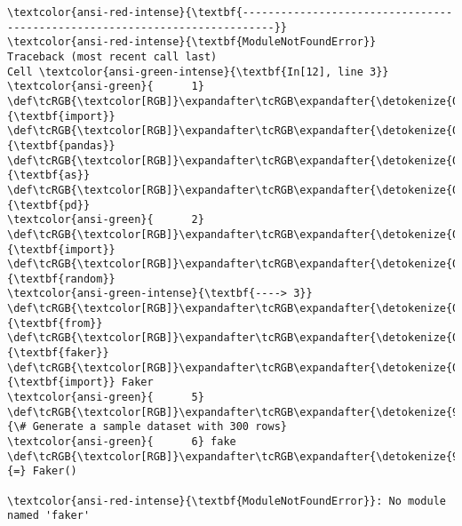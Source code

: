 \documentclass[11pt]{article}
\begin{document}
    \begin{Verbatim}[commandchars=\\\{\}, frame=single, framerule=2mm, rulecolor=\color{outerrorbackground}]
\textcolor{ansi-red-intense}{\textbf{---------------------------------------------------------------------------}}
\textcolor{ansi-red-intense}{\textbf{ModuleNotFoundError}}                       Traceback (most recent call last)
Cell \textcolor{ansi-green-intense}{\textbf{In[12], line 3}}
\textcolor{ansi-green}{      1} \def\tcRGB{\textcolor[RGB]}\expandafter\tcRGB\expandafter{\detokenize{0,135,0}}{\textbf{import}} \def\tcRGB{\textcolor[RGB]}\expandafter\tcRGB\expandafter{\detokenize{0,0,255}}{\textbf{pandas}} \def\tcRGB{\textcolor[RGB]}\expandafter\tcRGB\expandafter{\detokenize{0,135,0}}{\textbf{as}} \def\tcRGB{\textcolor[RGB]}\expandafter\tcRGB\expandafter{\detokenize{0,0,255}}{\textbf{pd}}
\textcolor{ansi-green}{      2} \def\tcRGB{\textcolor[RGB]}\expandafter\tcRGB\expandafter{\detokenize{0,135,0}}{\textbf{import}} \def\tcRGB{\textcolor[RGB]}\expandafter\tcRGB\expandafter{\detokenize{0,0,255}}{\textbf{random}}
\textcolor{ansi-green-intense}{\textbf{----> 3}} \def\tcRGB{\textcolor[RGB]}\expandafter\tcRGB\expandafter{\detokenize{0,135,0}}{\textbf{from}} \def\tcRGB{\textcolor[RGB]}\expandafter\tcRGB\expandafter{\detokenize{0,0,255}}{\textbf{faker}} \def\tcRGB{\textcolor[RGB]}\expandafter\tcRGB\expandafter{\detokenize{0,135,0}}{\textbf{import}} Faker
\textcolor{ansi-green}{      5} \def\tcRGB{\textcolor[RGB]}\expandafter\tcRGB\expandafter{\detokenize{95,135,135}}{\# Generate a sample dataset with 300 rows}
\textcolor{ansi-green}{      6} fake \def\tcRGB{\textcolor[RGB]}\expandafter\tcRGB\expandafter{\detokenize{98,98,98}}{=} Faker()

\textcolor{ansi-red-intense}{\textbf{ModuleNotFoundError}}: No module named 'faker'
    \end{Verbatim}
\end{document}
